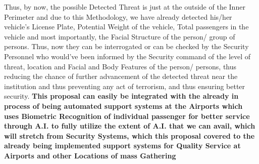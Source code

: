\documentclass[a4paper,11pt]{article}
\begin{document}
Thus, by now, the possible Detected Threat is just at the outside of the Inner Perimeter and due to this Methodology, we have already detected his/her vehicle's License Plate, Potential Weight of the vehicle, Total passengers in the vehicle and most importantly, the Facial Structure of the person/ group of persons. \newline
Thus, now they can be interrogated or can be checked by the Security Personnel who would've been informed by the Security command of the level of threat, location and Facial and Body Features of the person/ persons, thus reducing the chance of further advancement of the detected threat near the institution and thus preventing any act of terrorism, and thus ensuring better security.
\newline\newline
\textbf{This proposal can easily be integrated with the already in process of being automated support systems at the Airports which uses Biometric Recognition of individual passenger for better service through A.I. to fully utilize the extent of A.I. that we can avail, which will stretch from Security Systems, which this proposal covered to the already being implemented support systems for Quality Service at Airports and other Locations of mass Gathering \textbf{\cite{AI Already}}}
\end{document}
